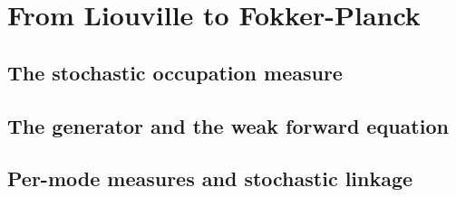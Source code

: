 
\section{From Liouville to Fokker-Planck}
\label{p3:sec:embedding}

\subsection{The stochastic occupation measure}
\label{p3:sub:stochastic_occupation_measure}

\subsection{The generator and the weak forward equation}
\label{p3:sub:generator_and_weak_equation}

\subsection{Per-mode measures and stochastic linkage}
\label{p3:sub:stochastic_linkage}
